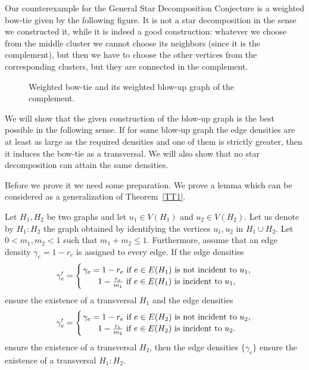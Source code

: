 \documentclass[12pt,a4paper]{amsart}
\numberwithin{equation}{section}
\begin{document}
\medskip

Our counterexample for the General Star Decomposition Conjecture is a weighted
bow-tie given by the following figure. 
It is not a star
decomposition in the sense we constructed it, while it is indeed a good
construction: whatever we choose from the middle 
cluster we cannot choose its neighbors (since it is the complement), but then
we have to choose the other vertices from the corresponding clusters, but they
are connected in the complement.\\

 \begin{figure}[h!] \label{bow-tie}
\begin{center}
\caption{Weighted bow-tie
  and its weighted blow-up graph of the complement.}   
\end{center}
\end{figure}

We will show that the given construction of the blow-up graph is the best
possible in the following sense. If for some blow-up graph the edge densities
are at least as large as the required densities and one of them is strictly
greater, then it induces the bow-tie as a transversal. We will also show that
no star decomposition can attain the same densities. 

Before we prove it we need some preparation. We prove a lemma which can be
considered as a generalization of Theorem~\ref{TT1}. 

\begin{lemma} \label{dens_glue} Let $H_1,H_2$ be two graphs and let $u_1\in
  V(H_1)$ and $u_2\in V(H_2)$.  
Let us denote by $H_1:H_2$ the graph obtained by identifying the vertices
$u_1,u_2$ in $H_1\cup H_2$. Let $0<m_1,m_2<1$ such that $m_1+m_2\leq 1$. 
Furthermore, assume that an  edge density $\gamma_e=1-r_e$ is assigned to
every edge. If the edge densities
$$\gamma'_e=\left\{ {\gamma_e=1-r_e \mbox{ if $e\in E(H_1)$ is not incident to
      $u_1$,}} 
    \atop    { 1-\frac{r_e}{m_1} \mbox{ if $e\in E(H_1)$ is incident
      to $u_1$,}} \right.$$
ensure the existence of a transversal $H_1$ and the edge densities
$$\gamma'_e=\left\{ {\gamma_e=1-r_e \mbox{ if $e\in E(H_2)$ is not incident to
      $u_2$,}} 
    \atop    { 1-\frac{r_e}{m_2} \mbox{ if $e\in E(H_2)$ is incident
      to $u_2$.} }\right.$$
ensure the existence of a transversal $H_2$,
then the edge densities $\{\gamma_e\}$ ensure the existence of a transversal
$H_1:H_2$.
\end{lemma}
\end{document}

